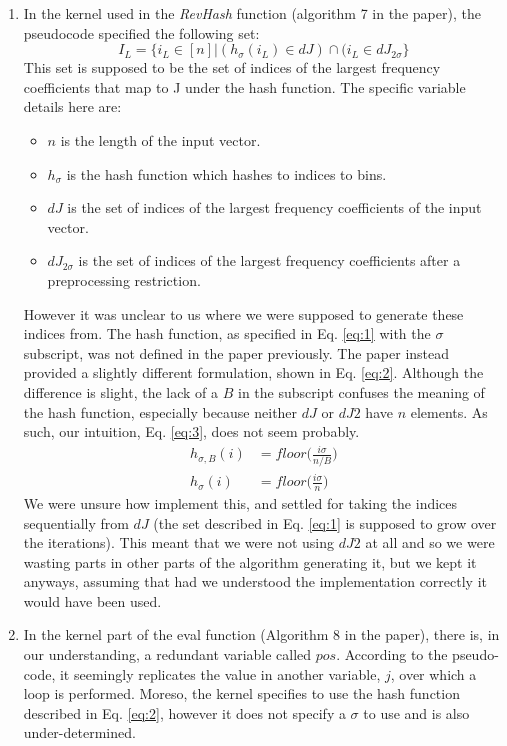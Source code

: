 \begin{enumerate}
    \item In the kernel used in the \textit{RevHash} function (algorithm 7 in the paper), the pseudocode specified the following set:
    \begin{equation}\label{eq:1}
        I_L = \{ i_L \in [n] | (h_\sigma(i_L) \in dJ) \cap (i_L \in dJ_{2\sigma} \}
    \end{equation}
    This set is supposed to be the set of indices of the largest frequency coefficients that map to J under the hash function. The specific variable details here are:
        \begin{itemize}
            \item $n$ is the length of the input vector.
            \item $h_\sigma$ is the hash function which hashes to indices to bins. 
            \item $dJ$ is the set of indices of the largest frequency coefficients of the input vector.
            \item $dJ_{2\sigma}$ is the set of indices of the largest frequency coefficients after a preprocessing restriction.
        \end{itemize}    
    However it was unclear to us where we were supposed to generate these indices from. The hash function, as specified in Eq. \ref{eq:1} with the $\sigma$ subscript, was not defined in the paper previously. The paper instead provided a slightly different formulation, shown in Eq. \ref{eq:2}. Although the difference is slight, the lack of a $B$ in the subscript confuses the meaning of the hash function, especially because neither $dJ$ or $dJ2$ have $n$ elements. As such, our intuition, Eq. \ref{eq:3}, does not seem probably.
    \begin{align}\label{eq:2}
        h_{\sigma,B}(i) &= floor\bigg(\frac{i\sigma}{n/B}\bigg) \\[10pt]
        \label{eq:3}
        h_{\sigma}(i) &= floor\bigg(\frac{i\sigma}{n}\bigg)
    \end{align}
    We were unsure how implement this, and settled for taking the indices sequentially from $dJ$ (the set described in Eq. \ref{eq:1} is supposed to grow over the iterations). This meant that we were not using $dJ2$ at all and so we were wasting parts in other parts of the algorithm generating it, but we kept it anyways, assuming that had we understood the implementation correctly it would have been used.
    
    \item In the kernel part of the eval function (Algorithm 8 in the paper), there is, in our understanding, a redundant variable called $pos$. According to the pseudo-code, it seemingly replicates the value in another variable, $j$, over which a loop is performed. Moreso, the kernel specifies to use the hash function described in Eq. \ref{eq:2}, however it does not specify a $\sigma$ to use and is also under-determined.

\end{enumerate}


